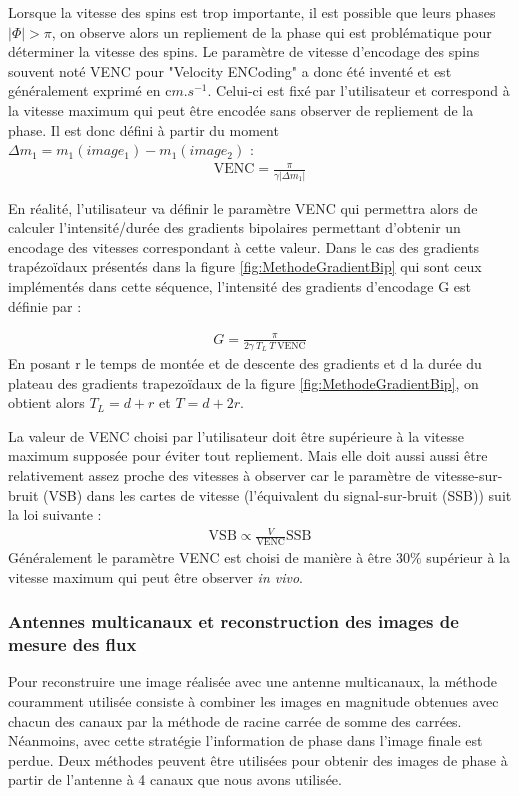 Lorsque la vitesse des spins est trop importante, il est possible que leurs phases $| \Phi | > \pi$, on observe alors un repliement de la phase qui est problématique pour déterminer la vitesse des spins. Le paramètre de vitesse d'encodage des spins souvent noté VENC pour "Velocity ENCoding" a donc été inventé et est généralement exprimé en c$m.s^{-1}$. Celui-ci est fixé par l'utilisateur et correspond à la vitesse maximum qui peut être encodée sans observer de repliement de la phase. Il est donc défini à partir du moment $\Delta m_1=m_1(image_1)-m_1(image_2)$ :
\begin{align}
\text{VENC} = \frac{\pi}{\gamma | \Delta m_1 |}
\end{align} 

En réalité, l'utilisateur va définir le paramètre VENC qui permettra alors de calculer l'intensité/durée des gradients bipolaires permettant d'obtenir un encodage des vitesses correspondant à cette valeur. Dans le cas des gradients trapézoïdaux présentés dans la figure \ref{fig:MethodeGradientBip} qui sont ceux implémentés dans cette séquence, l'intensité des gradients d'encodage G est définie par :

\begin{align}
G = \frac{\pi}{2 \gamma \ T_L \ T \ \text{VENC}}
\end{align}
En posant r le temps de montée et de descente des gradients et d la durée du plateau des gradients trapezoïdaux de la figure \ref{fig:MethodeGradientBip}, on obtient alors $T_L = d+r$ et $T = d+2r$.

La valeur de VENC choisi par l'utilisateur doit être supérieure à la vitesse maximum supposée pour éviter tout repliement. Mais elle doit aussi aussi être relativement assez proche des vitesses à observer car le paramètre de vitesse-sur-bruit (VSB) dans les cartes de vitesse (l'équivalent du signal-sur-bruit (SSB)) suit la loi suivante :
\begin{align}
\text{VSB} \propto \frac{V}{\text{VENC}}\text{SSB}
\end{align}
 Généralement le paramètre VENC est choisi de manière à être 30$\%$ supérieur à la vitesse maximum qui peut être observer \textit{in vivo}. 

\subsubsection{Antennes multicanaux et reconstruction des images de mesure des flux}

Pour reconstruire une image réalisée avec une antenne multicanaux, la méthode couramment utilisée consiste à combiner les images en magnitude obtenues avec chacun des canaux par la méthode de racine carrée de somme des carrées. Néanmoins, avec cette stratégie l’information de phase dans l’image finale est perdue.
Deux méthodes peuvent être utilisées pour obtenir des images de phase à partir de l’antenne à 4 canaux que nous avons utilisée.

